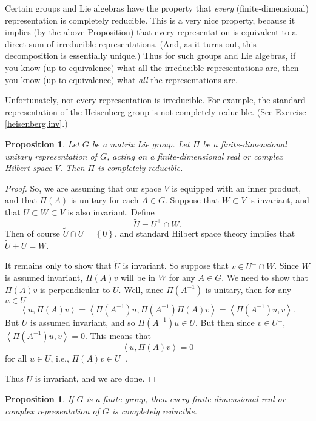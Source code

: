 \documentclass[12pt]{amsbook}
\theoremstyle{plain}
\newtheorem{proposition}[theorem]{Proposition}
\numberwithin{equation}{chapter}
\numberwithin{theorem}{chapter}
\begin{document}
Certain groups and Lie algebras have the property that \textit{every}
(finite-dimensional) representation is completely reducible. This is a very
nice property, because it implies (by the above Proposition) that every
representation is equivalent to a direct sum of irreducible representations.
(And, as it turns out, this decomposition is essentially unique.) Thus for
such groups and Lie algebras, if you know (up to equivalence) what all the
irreducible representations are, then you know (up to equivalence) what
\textit{all} the representations are.

Unfortunately, not every representation is irreducible. For example, the
standard representation of the Heisenberg group is not completely reducible.
(See Exercise \ref{heisenberg.inv}.)

\begin{proposition}
\label{unitary.reduce}Let $G$ be a matrix Lie group. Let $\Pi$ be a
finite-dimensional unitary representation of $G$, acting on a
finite-dimensional real or complex Hilbert space $V$. Then $\Pi$ is completely reducible.
\end{proposition}

\begin{proof}
So, we are assuming that our space $V$ is equipped with an inner product, and
that $\Pi(A)$ is unitary for each $A\in G$. Suppose that $W\subset V$ is
invariant, and that $U\subset W\subset V$ is also invariant. Define
\[
\widetilde{U}=U^{\perp}\cap W\text{.}%
\]
Then of course $\widetilde{U}\cap U=\left\{  0\right\}  $, and standard
Hilbert space theory implies that $\widetilde{U}+U=W$.

It remains only to show that $\widetilde{U}$ is invariant. So suppose that
$v\in U^{\perp}\cap W$. Since $W$ is assumed invariant, $\Pi(A)v$ will be in
$W$ for any $A\in G$. We need to show that $\Pi(A)v$ is perpendicular to $U$.
Well, since $\Pi(A^{-1})$ is unitary, then for any $u\in U$%
\[
\left\langle u,\Pi(A)v\right\rangle =\left\langle \Pi(A^{-1})u,\Pi(A^{-1}%
)\Pi(A)v\right\rangle =\left\langle \Pi(A^{-1})u,v\right\rangle \text{.}%
\]
But $U$ is assumed invariant, and so $\Pi(A^{-1})u\in U$. But then since $v\in
U^{\perp}$, $\left\langle \Pi(A^{-1})u,v\right\rangle =0$. This means that
\[
\left\langle u,\Pi(A)v\right\rangle =0
\]
for all $u\in U$, i.e., $\Pi(A)v\in U^{\perp}$.

Thus $\widetilde{U}$ is invariant, and we are done.
\end{proof}

\begin{proposition}
\label{finite.reduce}If $G$ is a finite group, then every finite-dimensional
real or complex representation of $G$ is completely reducible.
\end{proposition}
\end{document}
